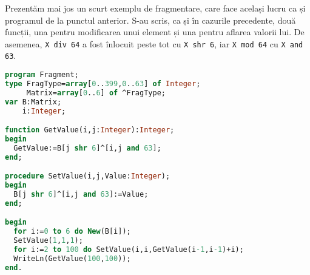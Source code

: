 Prezentăm mai jos un scurt exemplu de fragmentare, care face același lucru ca
și programul de la punctul anterior. S-au scris, ca și în cazurile precedente,
două funcții, una pentru modificarea unui element și una pentru aflarea
valorii lui. De asemenea, {\tt X div 64} a fost înlocuit peste tot cu {\tt X
  shr 6}, iar {\tt X mod 64} cu {\tt X and 63}.

\begin{lstlisting}[language=Pascal]
program Fragment;
type FragType=array[0..399,0..63] of Integer;
     Matrix=array[0..6] of ^FragType;
var B:Matrix;
    i:Integer;

function GetValue(i,j:Integer):Integer;
begin
  GetValue:=B[j shr 6]^[i,j and 63];
end;

procedure SetValue(i,j,Value:Integer);
begin
  B[j shr 6]^[i,j and 63]:=Value;
end;

begin
  for i:=0 to 6 do New(B[i]);
  SetValue(1,1,1);
  for i:=2 to 100 do SetValue(i,i,GetValue(i-1,i-1)+i);
  WriteLn(GetValue(100,100));
end.
\end{lstlisting}
